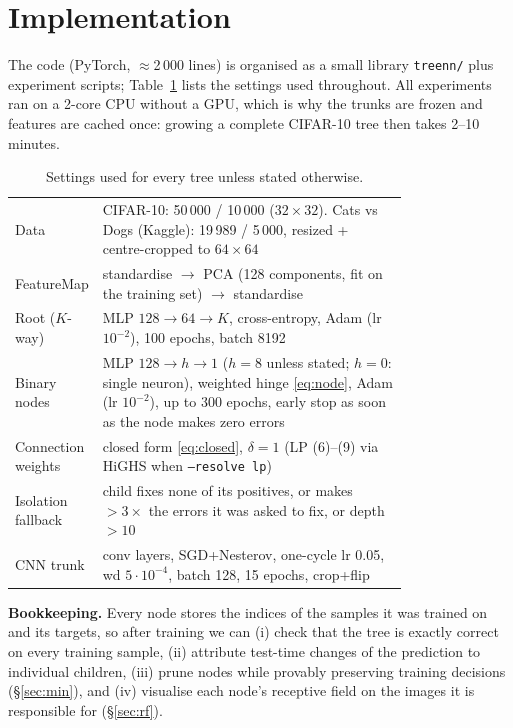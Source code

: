 \section{Implementation}
\label{sec:impl}
The code (PyTorch, $\approx$2\,000 lines) is organised as a small library \texttt{treenn/} plus
experiment scripts; Table~\ref{tab:impl} lists the settings used throughout. All experiments ran on a
2-core CPU without a GPU, which is why the trunks are frozen and features are cached once: growing a
complete CIFAR-10 tree then takes 2--10 minutes.

\begin{table}[h]
\centering\small
\caption{Settings used for every tree unless stated otherwise.}
\label{tab:impl}
\begin{tabular}{@{}l>{\raggedright\arraybackslash}p{0.78\linewidth}@{}}
\toprule
Data & CIFAR-10: 50\,000 / 10\,000 ($32{\times}32$). Cats vs Dogs (Kaggle): 19\,989 / 5\,000, resized + centre-cropped to $64{\times}64$\\
FeatureMap & standardise $\to$ PCA (128 components, fit on the training set) $\to$ standardise\\
Root ($K$-way) & MLP $128\!\to\!64\!\to\!K$, cross-entropy, Adam (lr $10^{-2}$), 100 epochs, batch 8192\\
Binary nodes & MLP $128\!\to\!h\!\to\!1$ ($h=8$ unless stated; $h=0$: single neuron), weighted hinge \eqref{eq:node}, Adam (lr $10^{-2}$), up to 300 epochs, early stop as soon as the node makes zero errors\\
Connection weights & closed form \eqref{eq:closed}, $\delta=1$ (LP (6)--(9) via HiGHS when \texttt{--resolve lp})\\
Isolation fallback & child fixes none of its positives, or makes $>3\times$ the errors it was asked to fix, or depth $>10$\\
CNN trunk & 6 conv layers, SGD+Nesterov, one-cycle lr 0.05, wd $5\cdot10^{-4}$, batch 128, 15 epochs, crop+flip\\
\bottomrule
\end{tabular}
\end{table}

\noindent\textbf{Bookkeeping.} Every node stores the indices of the samples it was trained on and its
targets, so after training we can (i) check that the tree is exactly correct on every training
sample, (ii) attribute test-time changes of the prediction to individual children, (iii) prune nodes
while provably preserving training decisions (\S\ref{sec:min}), and (iv) visualise each node's
receptive field on the images it is responsible for (\S\ref{sec:rf}).
